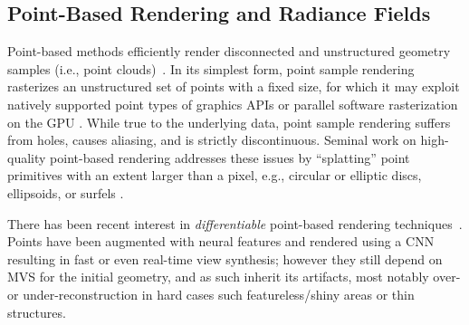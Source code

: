 \subsection{Point-Based Rendering and Radiance Fields}




Point-based methods efficiently render disconnected and unstructured geometry samples (i.e., point clouds)~\cite{gross2011point}.
In its simplest form, point sample rendering \cite{Grossman1998PointSR} rasterizes an unstructured set of points with a fixed size, for which it may exploit natively supported point types of graphics APIs \cite{SAINZ2004869} or parallel software rasterization on the GPU \cite{10.1145/3543863, laine2011high}. While true to the underlying data, point sample rendering suffers from holes, causes aliasing, and is strictly discontinuous. Seminal work on high-quality point-based rendering addresses these issues by “splatting” point primitives with an extent larger than a pixel, e.g., circular or elliptic discs, ellipsoids, or surfels \cite{10.1145/383259.383300, 10.5555/2386366.2386369,  Ren2002ObjectSE, 10.1145/344779.344936}.

There has been recent interest in \emph{differentiable} point-based rendering techniques~\cite{yifan19,wiles2020synsin}. Points have been augmented with neural features and rendered using a CNN~\cite{ruckert22,aliev20} resulting in fast or even real-time view synthesis; however they still depend on MVS for the initial geometry, and as such inherit its artifacts, most notably over- or under-reconstruction in hard cases such  featureless/shiny areas or thin structures.

